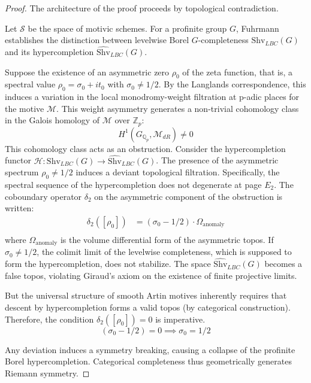 \documentclass[
]{article}
\begin{document}
\begin{proof}
The architecture of the proof proceeds by topological contradiction.

Let $\mathcal{S}$ be the space of motivic schemes. For a profinite group $G$, Fuhrmann establishes the distinction between levelwise Borel $G$-completeness $\mathrm{Shv}_{LBC}(G)$ and its hypercompletion $\widehat{\mathrm{Shv}}_{LBC}(G)$.

Suppose the existence of an asymmetric zero $\rho_0$ of the zeta function, that is, a spectral value $\rho_0 = \sigma_0 + it_0$ with $\sigma_0 \neq 1/2$.
By the Langlands correspondence, this induces a variation in the local monodromy-weight filtration at p-adic places for the motive $\mathcal{M}$.
This weight asymmetry generates a non-trivial cohomology class in the Galois homology of $\mathcal{M}$ over $\mathbb{Z}_p$:
\begin{equation*}
    H^1(G_{\mathbb{Q}_p}, \mathcal{M}_{dR}) \neq 0
\end{equation*}
This cohomology class acts as an obstruction.
Consider the hypercompletion functor $\mathcal{H}: \mathrm{Shv}_{LBC}(G) \to \widehat{\mathrm{Shv}}_{LBC}(G)$.
The presence of the asymmetric spectrum $\rho_0 \neq 1/2$ induces a deviant topological filtration. Specifically, the spectral sequence of the hypercompletion does not degenerate at page $E_2$.
The coboundary operator $\delta_2$ on the asymmetric component of the obstruction is written:
\begin{align*}
    \delta_2([\rho_0]) &= (\sigma_0 - 1/2) \cdot \Omega_{\text{anomaly}} \\
\end{align*}
where $\Omega_{\text{anomaly}}$ is the volume differential form of the asymmetric topos.
If $\sigma_0 \neq 1/2$, the colimit limit of the levelwise completeness, which is supposed to form the hypercompletion, does not stabilize.
The space $\widehat{\mathrm{Shv}}_{LBC}(G)$ becomes a false topos, violating Giraud's axiom on the existence of finite projective limits.

But the universal structure of smooth Artin motives inherently requires that descent by hypercompletion forms a valid topos (by categorical construction).
Therefore, the condition $\delta_2([\rho_0]) = 0$ is imperative.
\begin{equation*}
    (\sigma_0 - 1/2) = 0 \implies \sigma_0 = 1/2
\end{equation*}

Any deviation induces a symmetry breaking, causing a collapse of the profinite Borel hypercompletion.
Categorical completeness thus geometrically generates Riemann symmetry.
\end{proof}
\end{document}
